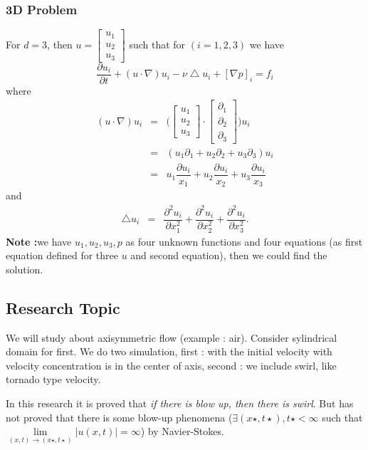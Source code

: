 \documentclass[a4paper,10pt]{article}
\begin{document}
\subsubsection{3D Problem}
For $ d=3 $, then $ u = \left[ {\begin{array}{c} u_{1} \\ u_{2} \\ u_{3}
\end{array} } \right] $ such that for $ (i=1,2,3) $ we have
\[ \dfrac{\partial u_{i}}{\partial t} + (u \cdot \nabla) u_{i} - \nu \bigtriangleup u_{i} + [\nabla p]_{i} = f_{i} \]
where
\begin{eqnarray}\nonumber
(u \cdot \nabla) u_{i} &=& \Big( \left[ 
\begin{array}{c}
u_{1} \\ u_{2} \\ u_{3}
\end{array} 
\right] \cdot \left[
\begin{array}{c}
\partial_{1} \\ \partial_{2} \\ \partial_{3}
\end{array}
\right] \Big) u_{i} \\ \nonumber
&=& (u_{1} \partial_{1} + u_{2} \partial_{2} + u_{3} \partial_{3}) u_{i} \\ \nonumber
&=& u_{1}\dfrac{\partial u_{i}}{x_{1}} + u_{2}\dfrac{\partial u_{i}}{x_{2}} + u_{3}\dfrac{\partial u_{i}}{x_{3}}
\end{eqnarray}
and
\begin{eqnarray} \nonumber
\bigtriangleup u_{i} &=& \dfrac{\partial^{2}u_{i}}{\partial x_{1}^2} + \dfrac{\partial^{2}u_{i}}{\partial x_{2}^2} + \dfrac{\partial^{2}u_{i}}{\partial x_{3}^2}.
\end{eqnarray}
\textbf{Note :}we have $ u_{1}, u_{2}, u_{3}, p $ as four unknown functions and four equations (as first equation defined for three $ u $ and second equation), then we could find the solution.

\subsection{Research Topic}
We will study about axisymmetric flow (example : air). Consider sylindrical domain for first. We do two simulation, first : with the initial velocity with velocity concentration is in the center of axis, second : we include swirl, like tornado type velocity.

In this research it is proved that \textit{if there is blow up, then there is swirl}. But has not proved that there is some blow-up phenomena ($ \exists(x\star, t\star), t\star<\infty $ such that $ \lim\limits_{(x,t)\rightarrow(x\star,t\star) }|u(x,t)|=\infty $) by Navier-Stokes.
\end{document}
